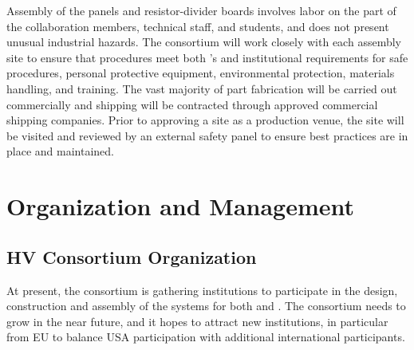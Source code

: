 Assembly of the  panels and resistor-divider boards involves labor on the part of the collaboration members, technical staff, and students, and  does not present unusual industrial hazards. The  consortium will work closely with each assembly site to ensure that procedures meet both \fnal{}'s and institutional requirements for safe procedures, personal protective equipment, environmental protection, %
materials handling, and training. The vast majority of %
part fabrication will be carried out commercially and shipping will be contracted through approved commercial shipping companies. Prior to approving a site as a production venue, the site will be visited and reviewed by an external safety panel to ensure best practices are in place and maintained. 

\section{Organization and Management}
\label{sec:fddp-hv-org}

\subsection{HV Consortium Organization}
\label{sec:fddp-hv-org-consortium}

At present, the  consortium is gathering %
institutions to participate in the design, construction and assembly of the  systems for both  and . %
The consortium needs to grow in the near future, and it hopes to attract new  institutions, in particular from EU to balance USA participation with additional international participants.

